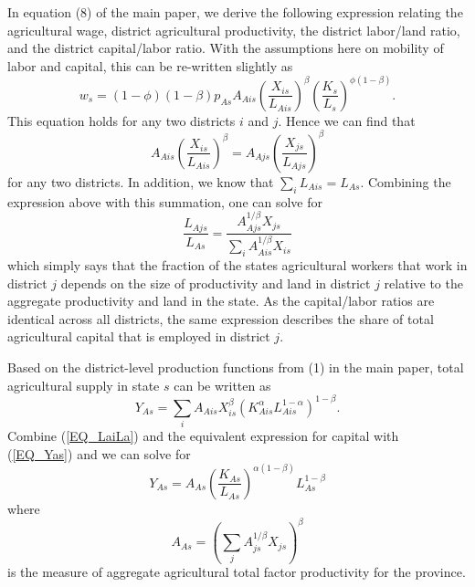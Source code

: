 \documentclass[11pt]{article}
\begin{document}
In equation (8) of the main paper, we derive the following expression relating the agricultural wage, district agricultural productivity, the district labor/land ratio, and the district capital/labor ratio. With the assumptions here on mobility of labor and capital, this can be re-written slightly as
\begin{equation}
    w_{s} = (1-\phi)(1-\beta) p_{As} A_{Ais} \left(\frac{X_{is}}{L_{Ais}}\right)^{\beta} \left(\frac{K_{s}}{L_{s}}\right)^{\phi(1-\beta)}.
\end{equation}
This equation holds for any two districts $i$ and $j$. Hence we can find that
\begin{equation}
    A_{Ais} \left(\frac{X_{is}}{L_{Ais}}\right)^{\beta} = A_{Ajs} \left(\frac{X_{js}}{L_{Ajs}}\right)^{\beta}
\end{equation}
for any two districts. In addition, we know that $\sum_i L_{Ais} = L_{As}$. Combining the expression above with this summation, one can solve for
\begin{equation}
    \frac{L_{Ajs}}{L_{As}} = \frac{A_{Ajs}^{1/\beta} X_{js}}{\sum_i A_{Ais}^{1/\beta} X_{is}} \label{EQ_LaiLa}
\end{equation}
which simply says that the fraction of the states agricultural workers that work in district $j$ depends on the size of productivity and land in district $j$ relative to the aggregate productivity and land in the state. As the capital/labor ratios are identical across all districts, the same expression describes the share of total agricultural capital that is employed in district $j$.

Based on the district-level production functions from (1) in the main paper, total agricultural supply in state $s$ can be written as
\begin{equation}
Y_{As} = \sum_{i} A_{Ais} X_{is}^{\beta} \left(K_{Ais}^{\alpha}L_{Ais}^{1-\alpha}\right)^{1-\beta}. \label{EQ_Yas}
\end{equation}
Combine (\ref{EQ_LaiLa}) and the equivalent expression for capital with (\ref{EQ_Yas}) and we can solve for
\begin{equation}
    Y_{As} = A_{As} \left(\frac{K_{As}}{L_{As}}\right)^{\alpha(1-\beta)} L_{As}^{1-\beta} \label{EQ_YA}
\end{equation}
where 
\begin{equation}
    A_{As} = \left(\sum_{j} A_{js}^{1/\beta}X_{js} \right)^\beta \nonumber
\end{equation}
is the measure of aggregate agricultural total factor productivity for the province.
\end{document}
